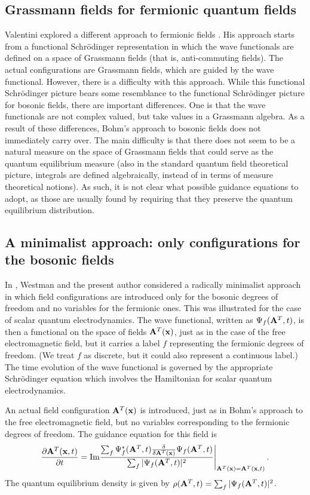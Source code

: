 \documentclass[12pt]{article}
\begin{document}
\subsection{Grassmann fields for fermionic quantum fields}
Valentini explored a different approach to fermionic fields \cite{valentini92,valentini96}. His approach starts from a functional Schr\"odinger representation in which the wave functionals are defined on a space of Grassmann fields (that is, anti-commuting fields). The actual configurations are Grassmann fields, which are guided by the wave functional. However, there is a difficulty with this approach. While this functional Schr\"odinger picture bears some resemblance to the functional Schr\"odinger picture for bosonic fields, there are important differences. One is that the wave functionals are not complex valued, but take values in a Grassmann algebra. As a result of these differences, Bohm's approach to bosonic fields does not immediately carry over. The main difficulty is that there does not seem to be a natural measure on the space of Grassmann fields that could serve as the quantum equilibrium measure (also in the standard quantum field theoretical picture, integrals are defined algebraically, instead of in terms of measure theoretical notions). As such, it is not clear what possible guidance equations to adopt, as those are usually found by requiring that they preserve the quantum equilibrium distribution.


\subsection{A minimalist approach: only configurations for the bosonic fields}
In \cite{struyve06,struyve07b}, Westman and the present author considered a radically minimalist approach in which field configurations are introduced only for the bosonic degrees of freedom and no variables for the fermionic ones. This was illustrated for the case of scalar quantum electrodynamics. The wave functional, written as $\Psi_f({\bf A}^T,t)$, is then a functional on the space of fields ${\bf A}^T({\bf x})$, just as in the case of the free electromagnetic field, but it carries a label $f$ representing the fermionic degrees of freedom. (We treat $f$ as discrete, but it could also represent a continuous label.) The time evolution of the wave functional is governed by the appropriate Schr\"odinger equation which involves the Hamiltonian for scalar quantum electrodynamics. 

An actual field configuration ${\bf A}^T({\bf x})$ is introduced, just as in Bohm's approach to the free electromagnetic field, but no variables corresponding to the fermionic degrees of freedom. The guidance equation for this field is
\begin{equation}
\frac{\partial {\bf A}^T ({\bf x},t)}{\partial t} = {\textrm{Im}} \frac{\sum_f \Psi^*_f({\bf A}^T,t) \frac{\delta }{\delta {\bf A}^T({\bf x})} \Psi_f({\bf A}^T,t) }{\sum_f |\Psi_f({\bf A}^T,t)|^2}\Bigg|_{{\bf A}^T({\bf x}) = {\bf A}^T ({\bf x},t)} \,.
\label{7}
\end{equation}
The quantum equilibrium density is given by $\rho({\bf A}^T,t)=\sum_f |\Psi_f({\bf A}^T,t)|^2$.
\end{document}
